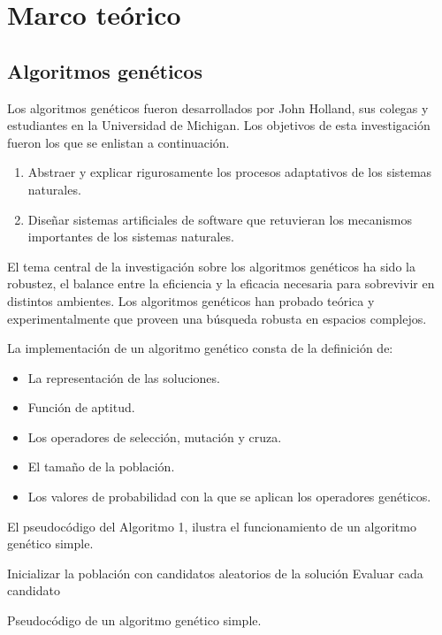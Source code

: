 \chapter{Marco teórico}

\section{Algoritmos genéticos}

Los algoritmos genéticos fueron desarrollados por John Holland, sus colegas y estudiantes en la Universidad de Michigan. Los objetivos de esta investigación fueron los que se enlistan a continuación.
\begin{enumerate}
	\item Abstraer y explicar rigurosamente los procesos adaptativos de los sistemas naturales.
	\item Diseñar sistemas artificiales de software que retuvieran los mecanismos importantes de los sistemas naturales.
\end{enumerate}

El tema central de la investigación sobre los algoritmos genéticos ha sido la robustez, el balance entre la eficiencia y la eficacia necesaria para sobrevivir en distintos ambientes. Los algoritmos genéticos han probado teórica y experimentalmente que proveen una búsqueda robusta en espacios complejos.

La implementación de un algoritmo genético consta de la definición de:

\begin{itemize}
	\item La representación de las soluciones.
	\item Función de aptitud.
	\item Los operadores de selección, mutación y cruza.
	\item El tamaño de la población.
	\item Los valores de probabilidad con la que se aplican los operadores genéticos.
\end{itemize}

El pseudocódigo del Algoritmo 1, ilustra el funcionamiento de un algoritmo genético simple.

\begin{algorithm}[h] 
	
	\SetAlgoLined
	Inicializar la población con candidatos aleatorios de la solución\;
	Evaluar cada candidato\;
	
	\caption{Pseudocódigo de un algoritmo genético simple.}
\end{algorithm}

